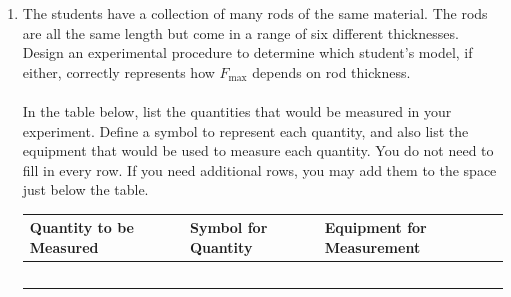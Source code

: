\documentclass[12pt]{article}
\begin{document}
\begin{enumerate}
\begin{enumerate}
    \item The students have a collection of many rods of the same material. The rods are all the same length but come in a range of six different thicknesses. Design an experimental procedure to determine which student’s model, if either, correctly represents how $F_{\text{max}}$ depends on rod thickness.\\\\
    In the table below, list the quantities that would be measured in your experiment. Define a symbol to represent each quantity, and also list the equipment that would be used to measure each quantity. You do not need to fill in every row. If you need additional rows, you may add them to the space just below the table. 

\begin{table}[h]
\centering
\begin{tabular}{|l|l|l|}
\hline
Quantity to be Measured & Symbol for Quantity & Equipment for Measurement \\ \hline
 &  &  \\ \hline
 &  &  \\ \hline
 &  &  \\ \hline
 &  &  \\ \hline
 &  &  \\ \hline
\end{tabular}
\end{table}


\end{enumerate}
\end{enumerate}
\end{document}
